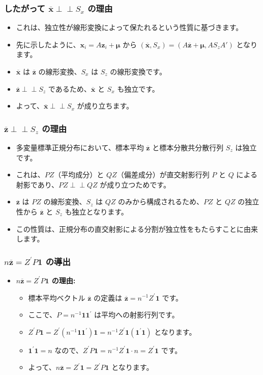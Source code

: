 \documentclass{beamer}
\begin{document}
\begin{frame}
\frametitle{したがって $\overline{\bm{x}}\perp\!\!\!\perp S_x$ の理由}
\begin{itemize}
    \item これは、独立性が線形変換によって保たれるという性質に基づきます。
    \item 先に示したように、$\bm{x}_i = A\bm{z}_i + \bm{\mu}$ から $(\overline{\bm{x}}, S_x) = (A\overline{\bm{z}} + \bm{\mu}, A S_z A')$ となります。
    \item $\overline{\bm{x}}$ は $\overline{\bm{z}}$ の線形変換、$S_x$ は $S_z$ の線形変換です。
    \item $\overline{\bm{z}} \perp\!\!\!\perp S_z$ であるため、$\overline{\bm{x}}$ と $S_x$ も独立です。
    \item よって、$\overline{\bm{x}} \perp\!\!\!\perp S_x$ が成り立ちます。
\end{itemize}
\end{frame}

\begin{frame}
\frametitle{$\overline{\bm{z}}\perp\!\!\!\perp S_z$ の理由}
\begin{itemize}
    \item 多変量標準正規分布において、標本平均 $\overline{\bm{z}}$ と標本分散共分散行列 $S_z$ は独立です。
    \item これは、$PZ$（平均成分）と $QZ$（偏差成分）が直交射影行列 $P$ と $Q$ による射影であり、$PZ \perp\!\!\!\perp QZ$ が成り立つためです。
    \item $\overline{\bm{z}}$ は $PZ$ の線形変換、$S_z$ は $QZ$ のみから構成されるため、$PZ$ と $QZ$ の独立性から $\overline{\bm{z}}$ と $S_z$ も独立となります。
    \item この性質は、正規分布の直交射影による分割が独立性をもたらすことに由来します。
\end{itemize}
\end{frame}

\begin{frame}
\frametitle{$n\overline{\bm{z}}=Z^{\prime}P\bm{1}$ の導出}
\begin{itemize}
    \item \textbf{$n\overline{\bm{z}}=Z^{\prime}P\bm{1}$ の理由:}
    \begin{itemize}
        \item 標本平均ベクトル $\overline{\bm{z}}$ の定義は $\overline{\bm{z}} = n^{-1}Z^{\prime}\bm{1}$ です。
        \item ここで、$P = n^{-1}\bm{1}\bm{1}^{\prime}$ は平均への射影行列です。
        \item $Z^{\prime}P\bm{1} = Z^{\prime}(n^{-1}\bm{1}\bm{1}^{\prime})\bm{1} = n^{-1}Z^{\prime}\bm{1}(\bm{1}^{\prime}\bm{1})$ となります。
        \item $\bm{1}^{\prime}\bm{1} = n$ なので、$Z^{\prime}P\bm{1} = n^{-1}Z^{\prime}\bm{1} \cdot n = Z^{\prime}\bm{1}$ です。
        \item よって、$n\overline{\bm{z}} = Z^{\prime}\bm{1} = Z^{\prime}P\bm{1}$ となります。
    \end{itemize}
\end{itemize}
\end{frame}
\end{document}
